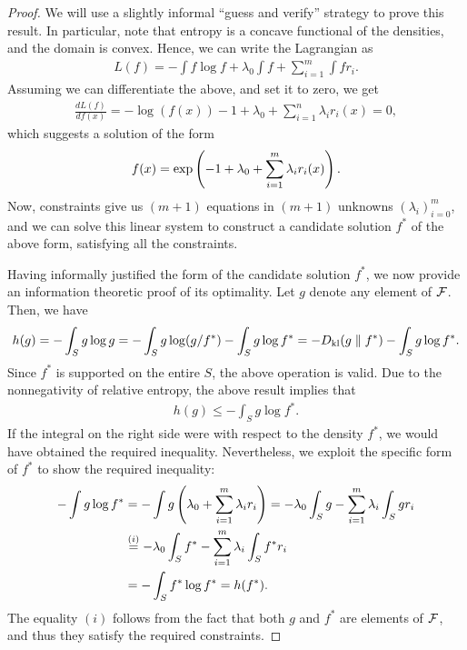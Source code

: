         \begin{proof}
            We will use a slightly informal ``guess and verify'' strategy to prove this result. In particular, note that entropy is a concave functional of the densities, and the domain is convex. Hence, we can write the Lagrangian as 
            \begin{align}
                L(f) = - \int f \log f + \lambda_0 \int f + \sum_{i=1}^m \int f r_i.   
            \end{align}
            Assuming we can differentiate the above, and set it to zero, we get 
            \begin{align}
                \frac{dL(f)}{df(x)} = - \log(f(x)) - 1 + \lambda_0 + \sum_{i=1}^n \lambda_i r_i(x) = 0,   
            \end{align}
            which suggests a solution of the form 
            \begin{align}
                f(x) = \exp \left( -1 + \lambda_0 + \sum_{i=1}^m \lambda_i r_i(x) \right). 
            \end{align}
            Now, constraints give us $(m+1)$ equations in $(m+1)$ unknowns $(\lambda_i)_{i=0}^m$, and we can solve this linear system to construct a candidate solution $f^*$ of the above form, satisfying all the constraints. 


            Having informally justified the form of the candidate solution $f^*$, we now provide an information theoretic proof of its optimality. Let $g$ denote any element of $\mathcal{F}$. Then, we have 
            \begin{align}
                h(g) = - \int_{S} g \log g = - \int_S g \log(g/f^*) - \int_{S} g \log f^* = -D_{\text{kl}}(g\parallel f^*) - \int_S g\log f^*. 
            \end{align}
            Since $f^*$ is supported on the entire $S$, the above operation is valid. Due to the nonnegativity of relative entropy, the above result implies that 
            \begin{align}
                h(g) \leq - \int_S g \log f^*. 
            \end{align}
            If the integral on the right side were with respect to the density $f^*$, we would have obtained the required inequality. Nevertheless, we exploit the specific form of $f^*$ to show the required inequality: 
            \begin{align}
                -\int g \log f^* &= - \int g \left( \lambda_0 + \sum_{i=1}^m \lambda_i r_i \right) = -\lambda_0 \int_S g  - \sum_{i=1}^m \lambda_i \int_S g r_i \\
                & \stackrel{(i)}{=}  -\lambda_0 \int_S f^*  - \sum_{i=1}^m \lambda_i \int_S f^* r_i \\ 
                & = - \int_S f^* \log f^* = h(f^*). 
            \end{align}
             The equality $(i)$ follows from the fact that both $g$ and $f^*$ are elements of $\mathcal{F}$, and thus they satisfy the required constraints. 
        \end{proof}
